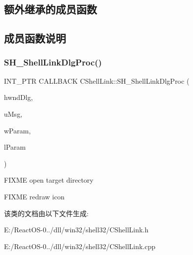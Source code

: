 \subsection*{额外继承的成员函数}


\subsection{成员函数说明}
\mbox{\label{class_c_shell_link_a76708b0ab0873a10734a5bb1cb0e4d07}} 
\subsubsection{\texorpdfstring{S\+H\+\_\+\+Shell\+Link\+Dlg\+Proc()}{SH\_ShellLinkDlgProc()}}
{\footnotesize\ttfamily I\+N\+T\+\_\+\+P\+TR C\+A\+L\+L\+B\+A\+CK C\+Shell\+Link\+::\+S\+H\+\_\+\+Shell\+Link\+Dlg\+Proc (\begin{DoxyParamCaption}\item[{\hyperlink{interfacevoid}{H\+W\+ND}}]{hwnd\+Dlg,  }\item[{U\+I\+NT}]{u\+Msg,  }\item[{W\+P\+A\+R\+AM}]{w\+Param,  }\item[{L\+P\+A\+R\+AM}]{l\+Param }\end{DoxyParamCaption})\hspace{0.3cm}{\ttfamily [static]}}

F\+I\+X\+ME open target directory

F\+I\+X\+ME redraw icon

该类的文档由以下文件生成\+:\begin{DoxyCompactItemize}
\item 
E\+:/\+React\+O\+S-\/0../dll/win32/shell32/C\+Shell\+Link.\+h\item 
E\+:/\+React\+O\+S-\/0../dll/win32/shell32/C\+Shell\+Link.\+cpp\end{DoxyCompactItemize}
